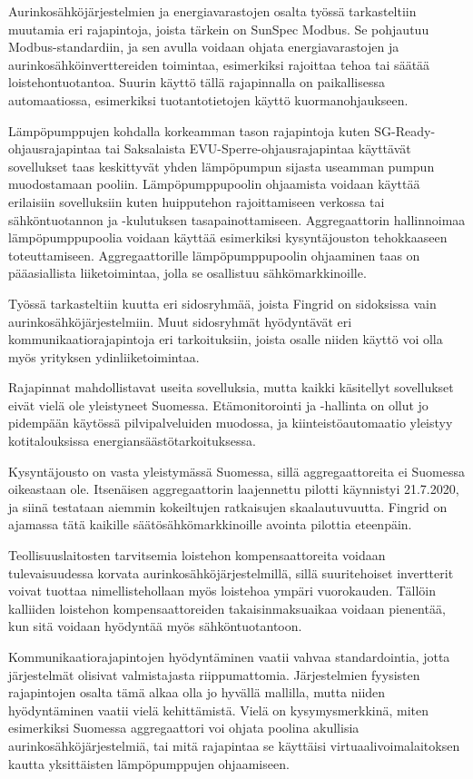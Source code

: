 Aurinkosähköjärjestelmien ja energiavarastojen osalta työssä tarkasteltiin muutamia eri rajapintoja, joista tärkein on SunSpec Modbus. Se pohjautuu Modbus-standardiin, ja sen avulla voidaan ohjata energiavarastojen ja aurinkosähköinverttereiden toimintaa, esimerkiksi rajoittaa tehoa tai säätää loistehontuotantoa. Suurin käyttö tällä rajapinnalla on paikallisessa automaatiossa, esimerkiksi tuotantotietojen käyttö kuormanohjaukseen.

Lämpöpumppujen kohdalla korkeamman tason rajapintoja kuten SG-Ready-ohjausrajapintaa tai Saksalaista EVU-Sperre-ohjausrajapintaa käyttävät sovellukset taas keskittyvät yhden lämpöpumpun sijasta useamman pumpun muodostamaan pooliin. Lämpöpumppupoolin ohjaamista voidaan käyttää erilaisiin sovelluksiin kuten huipputehon rajoittamiseen verkossa tai sähköntuotannon ja -kulutuksen tasapainottamiseen. Aggregaattorin hallinnoimaa lämpöpumppupoolia voidaan käyttää esimerkiksi kysyntäjouston tehokkaaseen toteuttamiseen. Aggregaattorille lämpöpumppupoolin ohjaaminen taas on pääasiallista liiketoimintaa, jolla se osallistuu sähkömarkkinoille.

Työssä tarkasteltiin kuutta eri sidosryhmää, joista Fingrid on sidoksissa vain aurinkosähköjärjestelmiin. Muut sidosryhmät hyödyntävät eri kommunikaatiorajapintoja eri tarkoituksiin, joista osalle niiden käyttö voi olla myös yrityksen ydinliiketoimintaa.

Rajapinnat mahdollistavat useita sovelluksia, mutta kaikki käsitellyt sovellukset eivät vielä ole yleistyneet Suomessa. Etämonitorointi ja -hallinta on ollut jo pidempään käytössä pilvipalveluiden muodossa, ja kiinteistöautomaatio yleistyy kotitalouksissa energiansäästötarkoituksessa.

Kysyntäjousto on vasta yleistymässä Suomessa, sillä aggregaattoreita ei Suomessa oikeastaan ole. Itsenäisen aggregaattorin laajennettu pilotti käynnistyi 21.7.2020, ja siinä testataan aiemmin kokeiltujen ratkaisujen skaalautuvuutta. Fingrid on ajamassa tätä kaikille säätösähkömarkkinoille avointa pilottia eteenpäin.

Teollisuuslaitosten tarvitsemia loistehon kompensaattoreita voidaan tulevaisuudessa korvata aurinkosähköjärjestelmillä, sillä suuritehoiset invertterit voivat tuottaa nimellistehollaan myös loistehoa ympäri vuorokauden. Tällöin kalliiden loistehon kompensaattoreiden takaisinmaksuaikaa voidaan pienentää, kun sitä voidaan hyödyntää myös sähköntuotantoon.

Kommunikaatiorajapintojen hyödyntäminen vaatii vahvaa standardointia, jotta järjestelmät olisivat valmistajasta riippumattomia. Järjestelmien fyysisten rajapintojen osalta tämä alkaa olla jo hyvällä mallilla, mutta niiden hyödyntäminen vaatii vielä kehittämistä. Vielä on kysymysmerkkinä, miten esimerkiksi Suomessa aggregaattori voi ohjata poolina akullisia aurinkosähköjärjestelmiä, tai mitä rajapintaa se käyttäisi virtuaalivoimalaitoksen kautta yksittäisten lämpöpumppujen ohjaamiseen.
